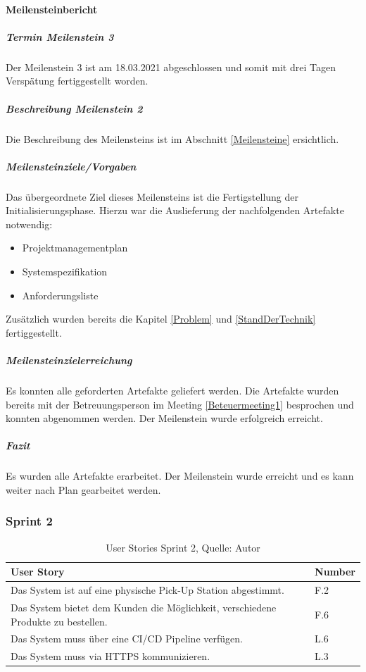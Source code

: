 \paragraph{Meilensteinbericht}
\subparagraph{Termin Meilenstein 3}
Der Meilenstein 3 ist am 18.03.2021 abgeschlossen und somit mit drei Tagen Verspätung fertiggestellt worden. 
\subparagraph{Beschreibung Meilenstein 2}
Die Beschreibung des Meilensteins ist im Abschnitt \ref{Meilensteine} ersichtlich. 
\subparagraph{Meilensteinziele/Vorgaben}
Das übergeordnete Ziel dieses Meilensteins ist die Fertigstellung der Initialisierungsphase.
Hierzu war die Auslieferung der nachfolgenden Artefakte notwendig:
\begin{itemize}
	\item Projektmanagementplan
	\item Systemspezifikation
	\item Anforderungsliste
\end{itemize}
Zusätzlich wurden bereits die Kapitel \ref{Problem} und \ref{StandDerTechnik} fertiggestellt. 
\subparagraph{Meilensteinzielerreichung}
Es konnten alle geforderten Artefakte geliefert werden. Die Artefakte wurden bereits mit der Betreuungsperson im Meeting \ref{Beteuermeeting1} besprochen und konnten abgenommen werden. 
Der Meilenstein wurde erfolgreich erreicht. 
\subparagraph{Fazit}
Es wurden alle Artefakte erarbeitet. Der Meilenstein wurde erreicht und es kann weiter nach Plan gearbeitet werden.

\subsubsection{Sprint 2}\label{sprint2}
\begin{table}[H]
	\setlength\extrarowheight{2pt} %
	\begin{tabularx}{\textwidth}{|X|l|}
		\hline
		\textbf{User Story} & \textbf{Number} \\
		\hline
		Das System ist auf eine physische Pick-Up Station abgestimmt. & F.2\\
		\hline
		Das System bietet dem Kunden die Möglichkeit, verschiedene Produkte zu bestellen. & F.6\\
		\hline
		Das System muss über eine CI/CD Pipeline verfügen. & L.6 \\
		\hline
		Das System muss via HTTPS kommunizieren. & L.3 \\
		\hline
	\end{tabularx} 
	\caption[User Stories Sprint 2]{User Stories Sprint 2, Quelle: Autor}
\end{table}\label{userStoriesSprint2}

